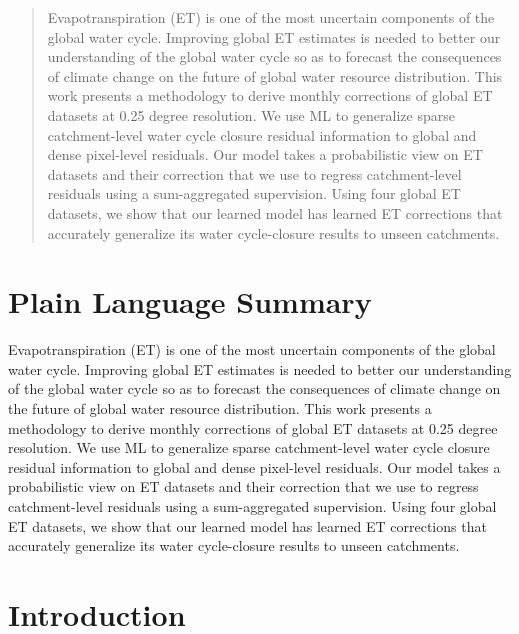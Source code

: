 \documentclass[draft]{agujournal2019}
\begin{document}

\begin{abstract}

Evapotranspiration (ET) is one of the most uncertain components of the global water cycle.
Improving global ET estimates is needed to better our understanding 
of the global water cycle so as to forecast the consequences of climate change 
on the future of global water resource distribution.
This work presents a methodology to derive monthly corrections of global ET datasets at 0.25 degree resolution. 
We use ML to generalize sparse catchment-level water cycle closure residual information to global and dense pixel-level residuals. 
Our model takes a probabilistic view on ET datasets and their correction that we use to 
regress catchment-level residuals using a sum-aggregated supervision. 
Using four global ET datasets, we show that our learned model has learned 
ET corrections that accurately generalize its water cycle-closure results to unseen catchments.
\end{abstract}

\section*{Plain Language Summary}


Evapotranspiration (ET) is one of the most uncertain components of the global water cycle.
Improving global ET estimates is needed to better our understanding 
of the global water cycle so as to forecast the consequences of climate change 
on the future of global water resource distribution.
This work presents a methodology to derive monthly corrections of global ET datasets at 0.25 degree resolution. 
We use ML to generalize sparse catchment-level water cycle closure residual information to global and dense pixel-level residuals. 
Our model takes a probabilistic view on ET datasets and their correction that we use to 
regress catchment-level residuals using a sum-aggregated supervision. 
Using four global ET datasets, we show that our learned model has learned 
ET corrections that accurately generalize its water cycle-closure results to unseen catchments.


%
%

\section{Introduction}
\end{document}
